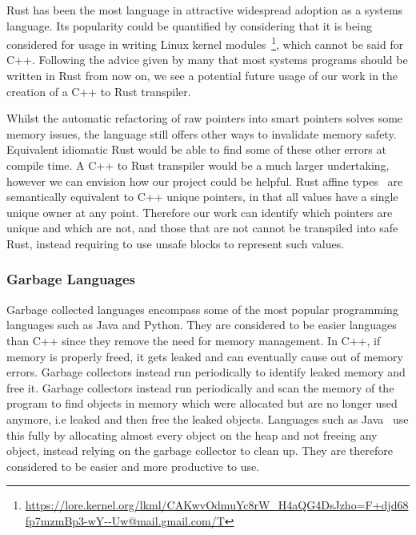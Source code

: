 \documentclass{proposal}
\begin{document}
    Rust has been the most language in attractive widespread adoption as a systems language.
    Its popularity could be quantified by considering that it is being considered for usage in writing Linux kernel modules~\footnote{\url{https://lore.kernel.org/lkml/CAKwvOdmuYc8rW_H4aQG4DsJzho=F+djd68fp7mzmBp3-wY--Uw@mail.gmail.com/T}}, which cannot be said for C++.
    Following the advice given by many that most systems programs should be written in Rust from now on, we see a potential future usage of our work in the creation of a C++ to Rust transpiler.

    Whilst the automatic refactoring of raw pointers into smart pointers solves some memory issues, the language still offers other ways to invalidate memory safety.
    Equivalent idiomatic Rust would be able to find some of these other errors at compile time.
    A C++ to Rust transpiler would be a much larger undertaking, however we can envision how our project could be helpful.
    Rust affine types~\cite{Balasubramanian2017} are semantically equivalent to C++ unique pointers, in that all values have a single unique owner at any point.
    Therefore our work can identify which pointers are unique and which are not, and those that are not cannot be transpiled into safe Rust, instead requiring to use unsafe blocks to represent such values.

    \subsubsection{Garbage Languages}

    Garbage collected languages encompass some of the most popular programming languages such as Java and Python.
    They are considered to be easier languages than C++ since they remove the need for memory management.
    In C++, if memory is properly freed, it gets leaked and can eventually cause out of memory errors.
    Garbage collectors instead run periodically to identify leaked memory and free it.
    Garbage collectors instead run periodically and scan the memory of the program to find objects in memory which were allocated but are no longer used anymore, i.e leaked and then free the leaked objects.
    Languages such as Java~\cite{Tauro2012} use this fully by allocating almost every object on the heap and not freeing any object, instead relying on the garbage collector to clean up.
    They are therefore considered to be easier and more productive to use.
\end{document}
